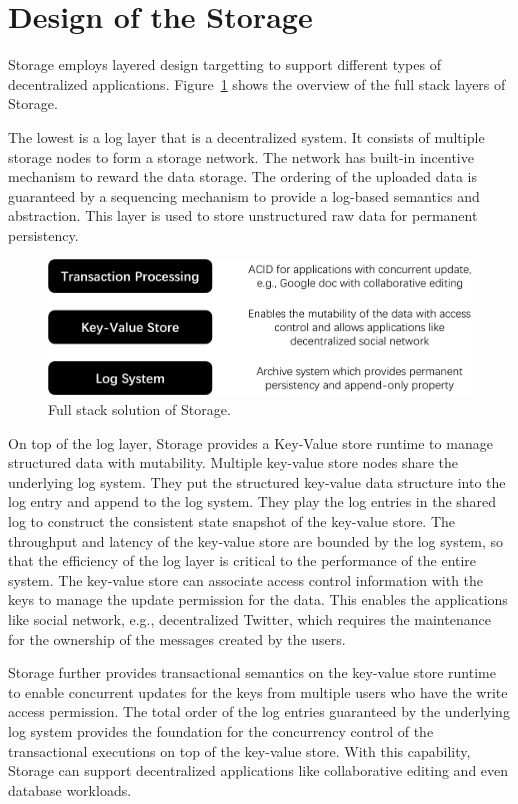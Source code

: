 \section{Design of the \projabbrev Storage}


\projabbrev Storage employs layered design targetting to support different types of decentralized applications. Figure~\ref{fig:stack} shows the overview of the full stack layers of \projabbrev Storage. 

The lowest is a log layer that is a decentralized system. It consists of multiple storage nodes to form a storage network. The network has built-in incentive mechanism to reward the data storage. The ordering of the uploaded data is guaranteed by a sequencing mechanism to provide a log-based semantics and abstraction. This layer is used to store unstructured raw data for permanent persistency.

\begin{figure}[H]	
	\includegraphics[width=\textwidth]{figure/stack-crop.pdf}
	\caption{Full stack solution of \projabbrev Storage.}
	\label{fig:stack}
\end{figure}

On top of the log layer, \projabbrev Storage provides a Key-Value store runtime to manage structured data with mutability. Multiple key-value store nodes share the underlying log system. They put the structured key-value data structure into the log entry and append to the log system. They play the log entries in the shared log to construct the consistent state snapshot of the key-value store. The throughput and latency of the key-value store are bounded by the log system, so that the efficiency of the log layer is critical to the performance of the entire system. The key-value store can associate access control information with the keys to manage the update permission for the data. This enables the applications like social network, e.g., decentralized Twitter, which requires the maintenance for the ownership of the messages created by the users. 

\projabbrev Storage further provides transactional semantics on the key-value store runtime to enable concurrent updates for the keys from multiple users who have the write access permission. The total order of the log entries guaranteed by the underlying log system provides the foundation for the concurrency control of the transactional executions on top of the key-value store. With this capability, \projabbrev Storage can support decentralized applications like collaborative editing and even database workloads.    

